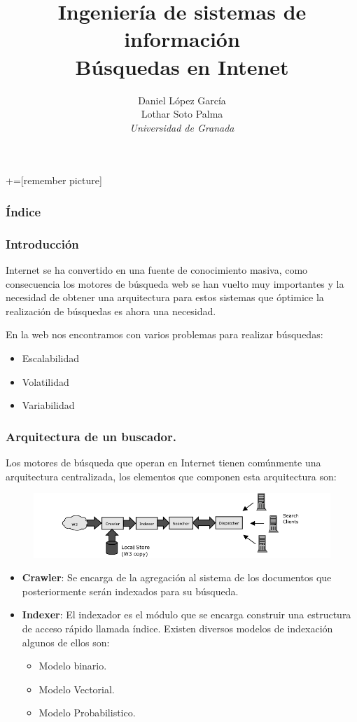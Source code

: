 \documentclass[9pt]{beamer} %
\author[Universidad de Granada]{Daniel López García\\ Lothar Soto Palma\\\textit{Universidad de Granada}}
\title{Ingeniería de sistemas de información\\ Búsquedas en Intenet}
\begin{document}
+=[remember picture]

\everymath{\displaystyle}

\begin{frame}
\titlepage
\end{frame}

\begin{frame}
\frametitle{Índice}
\tableofcontents
\end{frame}
\begin{frame}
	\frametitle{Introducción}
	Internet se ha convertido en una fuente de conocimiento masiva, como consecuencia los motores de búsqueda web se han vuelto muy importantes y la necesidad de obtener una arquitectura para estos sistemas que óptimice la realización de búsquedas es ahora una necesidad.
	
	\medskip
	En la web nos encontramos con varios problemas para realizar búsquedas:
		\begin{itemize}
			\item Escalabilidad
			\item Volatilidad 
			\item Variabilidad
		\end{itemize}
\end{frame}
\begin{frame}
	\frametitle{Arquitectura de un buscador.}
Los motores de búsqueda que operan en Internet tienen comúnmente una arquitectura centralizada, los elementos que componen esta arquitectura son:
		\begin{figure}[H]
			\centering
			\includegraphics[scale=0.6]{./img/modeloreferente.png}
		\end{figure}
		\begin{itemize}
			\item \textbf{Crawler}: Se encarga de la agregación al sistema de los documentos que posteriormente serán indexados para su búsqueda.
			\item \textbf{Indexer}: El indexador es el módulo que se encarga construir una estructura de acceso rápido llamada índice.
			Existen diversos modelos de indexación algunos de ellos son:
			\begin{itemize}
				\item Modelo binario.
				\item Modelo Vectorial.
				\item Modelo Probabilistico.
			\end{itemize}
		
		\end{itemize}
\end{frame}
\end{document}
